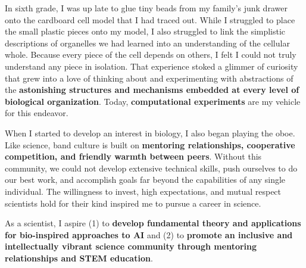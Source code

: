 In sixth grade, I was up late to glue tiny beads from my family's junk drawer onto the cardboard cell model that I had traced out.
While I struggled to place the small plastic pieces onto my model, I also struggled to link the simplistic descriptions of organelles we had learned into an understanding of the cellular whole.
Because every piece of the cell depends on others, I felt I could not truly understand any piece in isolation.
That experience stoked a glimmer of curiosity that grew into a love of thinking about and experimenting with abstractions of the \textbf{astonishing structures and mechanisms embedded at every level of biological organization}.
Today, \textbf{computational experiments} are my vehicle for this endeavor.

When I started to develop an interest in biology, I also began playing the oboe.
Like science, band culture is built on \textbf{mentoring relationships, cooperative competition, and friendly warmth between peers}.
Without this community, we could not develop extensive technical skills, push ourselves to do our best work, and accomplish goals far beyond the capabilities of any single individual.
The willingness to invest, high expectations, and mutual respect scientists hold for their kind inspired me to pursue a career in science.

As a scientist, I aspire
(1) to \textbf{develop fundamental theory and applications for bio-inspired approaches to AI} and
(2) to \textbf{promote an inclusive and intellectually vibrant science community through mentoring relationships and STEM education}.
